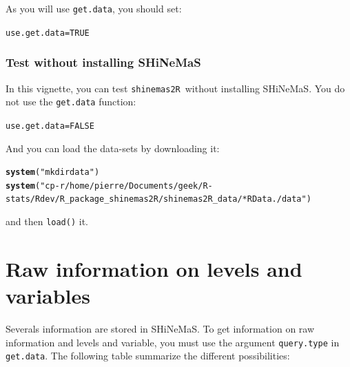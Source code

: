 \documentclass{article}\usepackage[]{graphicx}\usepackage[]{color}
\makeatletter
\newcommand{\hlnum}[1]{\textcolor[rgb]{0.686,0.059,0.569}{#1}}%
\newcommand{\hlstr}[1]{\textcolor[rgb]{0.192,0.494,0.8}{#1}}%
\newcommand{\hlstd}[1]{\textcolor[rgb]{0.345,0.345,0.345}{#1}}%
\newcommand{\hlkwb}[1]{\textcolor[rgb]{0.69,0.353,0.396}{#1}}%
\newcommand{\hlkwd}[1]{\textcolor[rgb]{0.737,0.353,0.396}{\textbf{#1}}}%
\newenvironment{kframe}{%
 \def\at@end@of@kframe{}%
 \ifinner\ifhmode%
  \def\at@end@of@kframe{\end{minipage}}%
  \begin{minipage}{\columnwidth}%
 \fi\fi%
 \def\FrameCommand##1{\hskip\@totalleftmargin \hskip-\fboxsep
 \colorbox{shadecolor}{##1}\hskip-\fboxsep
     \hskip-\linewidth \hskip-\@totalleftmargin \hskip\columnwidth}%
 \MakeFramed {\advance\hsize-\width
   \@totalleftmargin\z@ \linewidth\hsize
   \@setminipage}}%
 {\par\unskip\endMakeFramed%
 \at@end@of@kframe}
\newenvironment{knitrout}{}{} %
\newcommand{\BD}{SHiNeMaS}
\newcommand{\pack}{\texttt{shinemas2R}}
\makeatother
\begin{document}
As you will use \texttt{get.data}, you should set:
\begin{knitrout}
\color{fgcolor}\begin{kframe}
\begin{alltt}
\hlstd{use.get.data} \hlkwb{=} \hlnum{TRUE}
\end{alltt}
\end{kframe}
\end{knitrout}

\subsubsection{Test without installing \BD}

In this vignette, you can test \pack~without installing \BD.
You do not use the \texttt{get.data} function:
\begin{knitrout}
\color{fgcolor}\begin{kframe}
\begin{alltt}
\hlstd{use.get.data} \hlkwb{=} \hlnum{FALSE}
\end{alltt}
\end{kframe}
\end{knitrout}

And you can load the data-sets by downloading it:

\begin{knitrout}
\color{fgcolor}\begin{kframe}
\begin{alltt}
\hlkwd{system}\hlstd{(}\hlstr{"mkdir data"}\hlstd{)}
\hlkwd{system}\hlstd{(}\hlstr{"cp -r /home/pierre/Documents/geek/R-stats/Rdev/R_package_shinemas2R/shinemas2R_data/*RData ./data"}\hlstd{)}
\end{alltt}
\end{kframe}
\end{knitrout}

and then \texttt{load()} it.


\newpage


\section{Raw information on levels and variables}
\label{raw}

Severals information are stored in \BD.
To get information on raw information and levels and variable, you must use the argument \texttt{query.type} in \texttt{get.data}.
The following table summarize the different possibilities:
\end{document}
